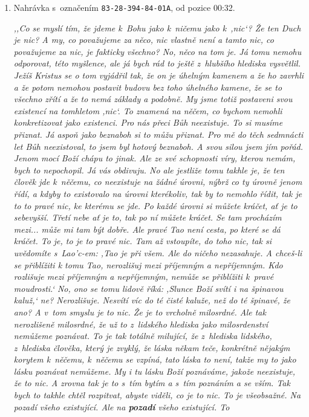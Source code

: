 \begin{enumerate}
{}

\item{%
Nahrávka s~označením \texttt{83-28-394-84-01A}, od pozice 00:32.

\textit{%
,,Co se myslí tím, že jdeme k~Bohu jako k~ničemu jako k~,nic`? Že ten Duch je
nic? A my, co považujeme za něco, nic vlastně není a tamto nic, co považujeme
za nic, je fakticky všechno? No, něco na tom je. Já tomu nemohu odporovat, této
myšlence, ale já bych rád to ještě z~hlubšího hlediska vysvětlil. Ježíš Kristus
se o tom vyjádřil tak, že on je úhelným kamenem a že ho zavrhli a že potom
nemohou postavit budovu bez toho úhelného kamene, že se to všechno zřítí a že to
nemá základy a podobně. My jsme totiž postaveni svou existencí na tomhletom
,nic`. To znamená na něčem, co bychom nemohli konkretizovat jako existenci. Pro
nás přeci Bůh neexistuje. To si musíme přiznat. Já aspoň jako beznaboh si to
můžu přiznat. Pro mě do těch sedmnácti let Bůh neexistoval, to jsem byl hotový
beznaboh. A svou silou jsem jím pořád. Jenom mocí Boží chápu to jinak. Ale ze
své schopnosti víry, kterou nemám, bych to nepochopil. Já vás obdivuju. No ale
jestliže tomu takhle je, že ten člověk jde k~něčemu, co neexistuje na žádné
úrovni, nýbrž co ty úrovně jenom řídí, a kdyby to existovalo na úrovni
kterékoliv, tak by to nemohlo řídit, tak je to to pravé nic, ke kterému se jde.
Po každé úrovni si můžete kráčet, ať je to sebevyšší. Třetí nebe ať je to, tak
po ní můžete kráčet. Se tam procházím mezi... může mi tam být dobře. Ale pravé
Tao není cesta, po které se dá kráčet. To je, to je to pravé nic. Tam až
vstoupíte, do toho nic, tak si uvědomíte s~Lao'c-em: ,Tao je při všem. Ale do
ničeho nezasahuje. A chceš-li se přiblížiti k tomu Tao, nerozlišuj mezi
příjemným a nepříjemným. Kdo rozlišuje mezi příjemným a nepříjemným, nemůže se
přiblížiti k~pravé moudrosti.` No, ono se tomu lidově říká: ,Slunce Boží svítí i na
špinavou kaluž,` ne? Nerozlišuje. Nesvítí víc do té
čisté kaluže, než do té špinavé, že ano? A v~tom smyslu je to nic. Že je to
vrcholně milosrdné. Ale tak nerozlišeně milosrdné, že už to z~lidského hlediska
jako milosrdenství nemůžeme poznávat. To je tak totálně milující, že z~hlediska
lidského, z~hlediska člověka, který je zvyklý, že láska někam teče, konkrétně
nějakým korytem k~něčemu, k~něčemu se vzpíná, tato láska to není, takže my to
jako lásku poznávat nemůžeme. My i tu lásku Boží poznáváme, jakože neexistuje,
že to nic. A zrovna tak je to s~tím bytím a s~tím poznáním a se vším. Tak bych
to takhle chtěl rozpitvat, abyste viděli, co je to nic. To je všeobsažné.
Na pozadí všeho existující. Ale na \textbf{pozadí} všeho existující. To
}}
\end{enumerate}
